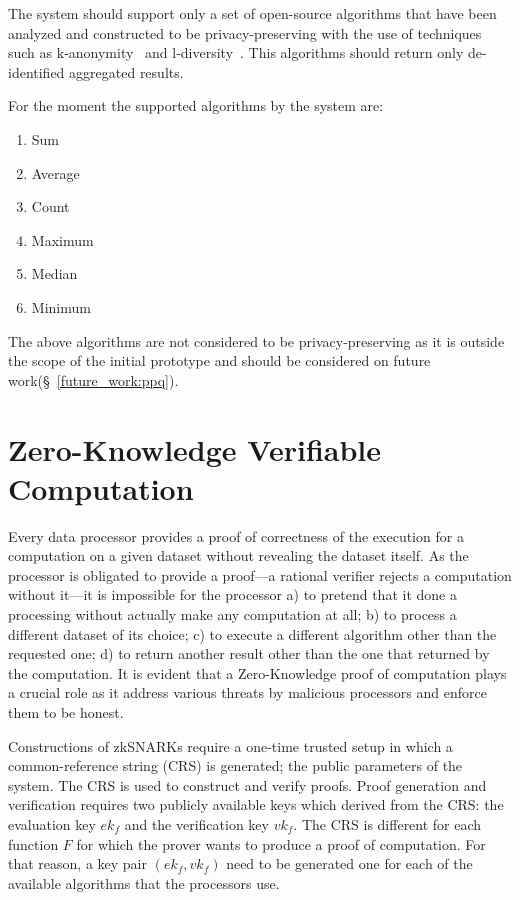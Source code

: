 The system should support only a set of open-source algorithms that have been analyzed and constructed to be privacy-preserving with the use of techniques such as k-anonymity~\cite{Samarati98protectingprivacy} and l-diversity~\cite{Aggarwal2008}. This algorithms should return only de-identified aggregated results.

For the moment the supported algorithms by the system are:

\begin{enumerate}
  \item Sum
  \item Average
  \item Count
  \item Maximum
  \item Median
  \item Minimum
\end{enumerate}

The above algorithms are not considered to be privacy-preserving as it is outside the scope of the initial prototype and should be considered on future work(§~\ref{future_work:ppq}).

\section{Zero-Knowledge Verifiable Computation}
\label{solution:proof}

Every data processor provides a proof of correctness of the execution for a computation on a given dataset without revealing the dataset itself. As the processor is obligated to provide a proof---a rational verifier rejects a computation without it---it is impossible for the processor a) to pretend that it done a processing without actually make any computation at all; b) to process a different dataset of its choice; c) to execute a different algorithm other than the requested one; d) to return another result other than the one that returned by the computation. It is evident that a Zero-Knowledge proof of computation plays a crucial role as it address various threats by malicious processors and enforce them to be honest.

Constructions of zkSNARKs require a one-time trusted setup in which a common-reference string (CRS) is generated; the public parameters of the system. The CRS is used to construct and verify proofs. Proof generation and verification requires two publicly available keys which derived from the CRS: the evaluation key $ek_f$ and the verification key $vk_f$. The CRS is different for each function $F$ for which the prover wants to produce a proof of computation. For that reason, a key pair $(ek_f, vk_f)$ need to be generated one for each of the available algorithms that the processors use.

